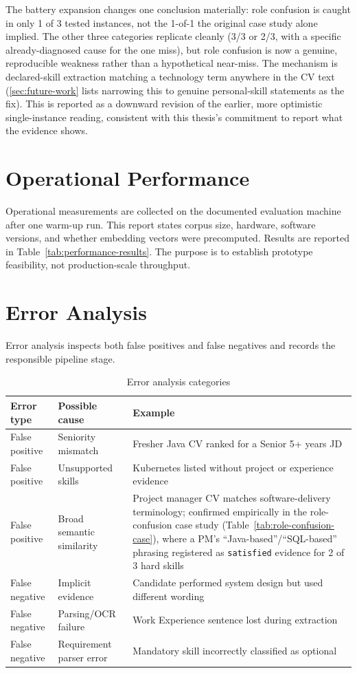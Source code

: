 \documentclass[12pt,a4paper,oneside]{report}
\begin{document}
The battery expansion changes one conclusion materially: role confusion is caught in only 1 of 3 tested instances, not the 1-of-1 the original case study alone implied. The other three categories replicate cleanly (3/3 or 2/3, with a specific already-diagnosed cause for the one miss), but role confusion is now a genuine, reproducible weakness rather than a hypothetical near-miss. The mechanism is declared-skill extraction matching a technology term anywhere in the CV text (\cref{sec:future-work} lists narrowing this to genuine personal-skill statements as the fix). This is reported as a downward revision of the earlier, more optimistic single-instance reading, consistent with this thesis's commitment to report what the evidence shows.

\section{Operational Performance}
Operational measurements are collected on the documented evaluation machine after one warm-up run. This report states corpus size, hardware, software versions, and whether embedding vectors were precomputed. Results are reported in Table~\ref{tab:performance-results}. The purpose is to establish prototype feasibility, not production-scale throughput.

\section{Error Analysis}
Error analysis inspects both false positives and false negatives and records the responsible pipeline stage.

\begin{table}[htbp]
\centering
\caption{Error analysis categories}
\label{tab:errors}
\begin{tabularx}{\textwidth}{p{}p{}X}
\toprule
Error type & Possible cause & Example \\
\midrule
False positive & Seniority mismatch & Fresher Java CV ranked for a Senior 5+ years JD \\
False positive & Unsupported skills & Kubernetes listed without project or experience evidence \\
False positive & Broad semantic similarity & Project manager CV matches software-delivery terminology; confirmed empirically in the role-confusion case study (Table~\ref{tab:role-confusion-case}), where a PM's ``Java-based''/``SQL-based'' phrasing registered as \texttt{satisfied} evidence for 2 of 3 hard skills \\
False negative & Implicit evidence & Candidate performed system design but used different wording \\
False negative & Parsing/OCR failure & Work Experience sentence lost during extraction \\
False negative & Requirement parser error & Mandatory skill incorrectly classified as optional \\
\bottomrule
\end{tabularx}
\end{table}
\end{document}
